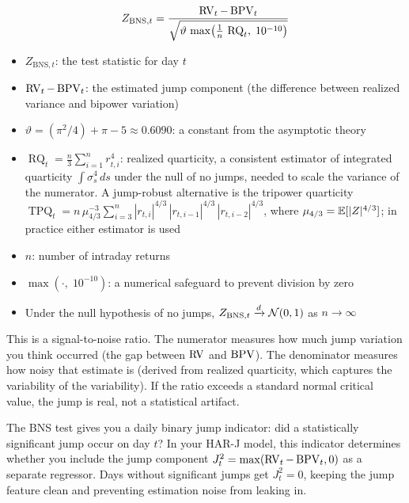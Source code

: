\begin{definition}
\begin{equation}
  Z_{\text{BNS},t} = \frac{\operatorname{RV}_t - \operatorname{BPV}_t}{\sqrt{\vartheta\,\max\!\left(\frac{1}{n}\,\operatorname{RQ}_t,\; 10^{-10}\right)}}
  \label{eq:bns-test}
\end{equation}
\begin{itemize}[nosep]
  \item $Z_{\text{BNS},t}$: the test statistic for day $t$
  \item $\operatorname{RV}_t - \operatorname{BPV}_t$: the estimated jump component (the difference between realized variance and bipower variation)
  \item $\vartheta = (\pi^2/4) + \pi - 5 \approx 0.6090$: a constant from the asymptotic theory
  \item $\operatorname{RQ}_t = \frac{n}{3}\sum_{i=1}^{n}r_{t,i}^4$: realized quarticity, a consistent estimator of integrated quarticity $\int\sigma^4_s\,ds$ under the null of no jumps, needed to scale the variance of the numerator.  A jump-robust alternative is the tripower quarticity $\operatorname{TPQ}_t = n\,\mu_{4/3}^{-3}\sum_{i=3}^{n}|r_{t,i}|^{4/3}\,|r_{t,i-1}|^{4/3}\,|r_{t,i-2}|^{4/3}$, where $\mu_{4/3} = \mathbb{E}[|Z|^{4/3}]$; in practice either estimator is used
  \item $n$: number of intraday returns
  \item $\max(\cdot,\;10^{-10})$: a numerical safeguard to prevent division by zero
  \item Under the null hypothesis of no jumps, $Z_{\text{BNS},t} \xrightarrow{d} \mathcal{N}(0,1)$ as $n \to \infty$
\end{itemize}

\begin{intuition}
This is a signal-to-noise ratio.
The numerator measures how much jump variation you think occurred (the gap between $\operatorname{RV}$ and $\operatorname{BPV}$).
The denominator measures how noisy that estimate is (derived from realized quarticity, which captures the variability of the variability).
If the ratio exceeds a standard normal critical value, the jump is real, not a statistical artifact.
\end{intuition}
\end{definition}

\begin{projectconnection}
The BNS test gives you a daily binary jump indicator: did a statistically significant jump occur on day $t$?
In your HAR-J model, this indicator determines whether you include the jump component $J_t^2 = \max(\operatorname{RV}_t - \operatorname{BPV}_t, 0)$ as a separate regressor.
Days without significant jumps get $J_t^2 = 0$, keeping the jump feature clean and preventing estimation noise from leaking in.
\end{projectconnection}

